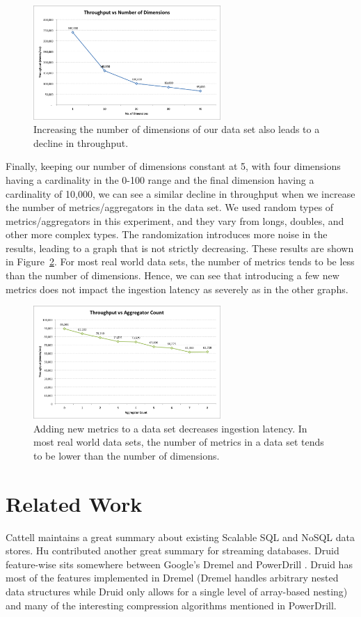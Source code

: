 \documentclass{acm_proc_article-sp}
\begin{document}
\begin{figure}
\centering
\includegraphics[width = 2.8in]{throughput_vs_num_dims}
\caption{Increasing the number of dimensions of our data set also leads to a decline in throughput.}
\label{fig:throughput_vs_num_dims}
\end{figure}

Finally, keeping our number of dimensions constant at 5, with four dimensions
having a cardinality in the 0-100 range and the final dimension having a
cardinality of 10,000, we can see a similar decline in throughput when we
increase the number of metrics/aggregators in the data set. We used random
types of metrics/aggregators in this experiment, and they vary from longs,
doubles, and other more complex types. The randomization introduces more noise
in the results, leading to a graph that is not strictly decreasing. These
results are shown in Figure~\ref{fig:throughput_vs_num_metrics}. For most real
world data sets, the number of metrics tends to be less than the number of
dimensions.  Hence, we can see that introducing a few new metrics does not
impact the ingestion latency as severely as in the other graphs.

\begin{figure}
\centering
\includegraphics[width = 2.8in]{throughput_vs_num_metrics}
\caption{Adding new metrics to a data set decreases ingestion latency. In most
real world data sets, the number of metrics in a data set tends to be lower
than the number of dimensions.}
\label{fig:throughput_vs_num_metrics}
\end{figure}

\section{Related Work}
\label{sec:related}
Cattell \cite{cattell2011scalable} maintains a great summary about existing
Scalable SQL and NoSQL data stores. Hu \cite{hu2011stream} contributed another
great summary for streaming databases.  Druid feature-wise sits somewhere
between Google’s Dremel \cite{melnik2010dremel} and PowerDrill
\cite{hall2012processing}. Druid has most of the features implemented in Dremel
(Dremel handles arbitrary nested data structures while Druid only allows for a
single level of array-based nesting) and many of the interesting compression
algorithms mentioned in PowerDrill.
\end{document}
